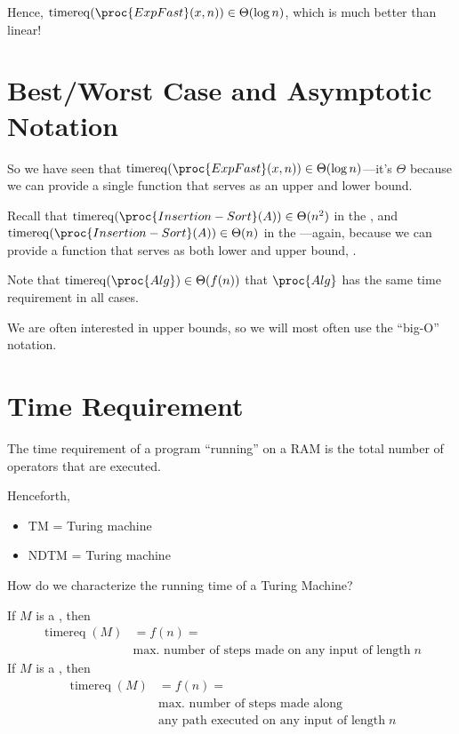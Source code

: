 \documentclass[a4paper]{report}
\newcommand{\bookref}[3]{\marginpar{\faBook{}~#1\\Chapter #2\\Section #3}}
\theoremstyle{definition}
\DeclareMathOperator*{\treq}{timereq}
\begin{document}
Hence, $\treq(\proc{ExpFast}(x,n)) \in \Theta(\log n)$, which is much better than linear!

\section{Best/Worst Case and Asymptotic Notation}
So we have seen that $\treq(\proc{ExpFast}(x,n)) \in \Theta(\log n)$---it's $\Theta$ because we can provide a single function that serves as an upper and lower bound.

Recall that $\treq(\proc{Insertion-Sort}(A)) \in \Theta(n^2)$ in the , and $\treq(\proc{Insertion-Sort}(A)) \in \Theta(n)$ in the ---again, because we can provide a function that serves as both lower and upper bound, .

Note that $\treq(\proc{Alg}) \in \Theta(f(n))$  that $\proc{Alg}$ has the same time requirement in all cases.

We are often interested in upper bounds, so we will most often use the ``big-O'' notation.

\section{Time Requirement}
\bookref{ER}{27}{27.4}
The time requirement of a program ``running'' on a RAM is the total number of operators that are executed.

Henceforth,
\begin{itemize}
\item TM =  Turing machine
\item NDTM =  Turing machine
\end{itemize}

How do we characterize the running time of a Turing Machine?

If $M$ is a , then
%
\begin{align*}
\treq(M) & = f(n) =\\ &\text{max.~number of steps made on any input of length} \;n
\end{align*}
%
If $M$ is a , then
%
\begin{align*}
\treq(M) & = f(n) =\\ &\text{max.~number of steps made along}\\ & \text{any path executed on any input of length} \;n
\end{align*}
\end{document}
